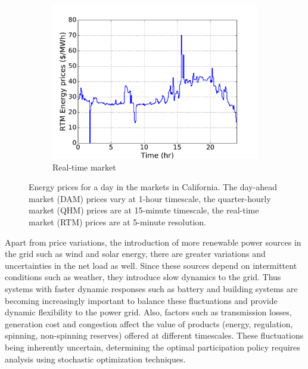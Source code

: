 \documentclass[11pt,twoside]{article}
\begin{document}
\begin{figure}[h!tp]
\begin{subfigure}[b]{0.32\textwidth} \includegraphics[width=\textwidth]{Figures/rtmprices.pdf} \caption{Real-time market}\label{rtmprices}\end{subfigure} \hfill
\caption{Energy prices for a day in the markets in California. The day-ahead market (DAM) prices vary at 1-hour timescale, the quarter-hourly market (QHM) prices are at 15-minute timescale, the real-time market (RTM) prices are at 5-minute resolution.}\label{eprices}
\end{figure}

Apart from price variations, the introduction of more renewable power sources in the grid such as wind and solar energy, there are greater variations and uncertainties in the net load as well. Since these sources depend on intermittent conditions such as weather, they introduce slow dynamics to the grid. Thus systems with faster dynamic responses such as battery and building systems are becoming increasingly important to balance these fluctuations and provide dynamic flexibility to the power grid. Also, factors such as transmission losses, generation cost and congestion affect the value of products (energy, regulation, spinning, non-spinning reserves) offered at different timescales. These fluctuations being inherently uncertain, determining the optimal participation policy requires analysis using stochastic optimization techniques.
\end{document}

